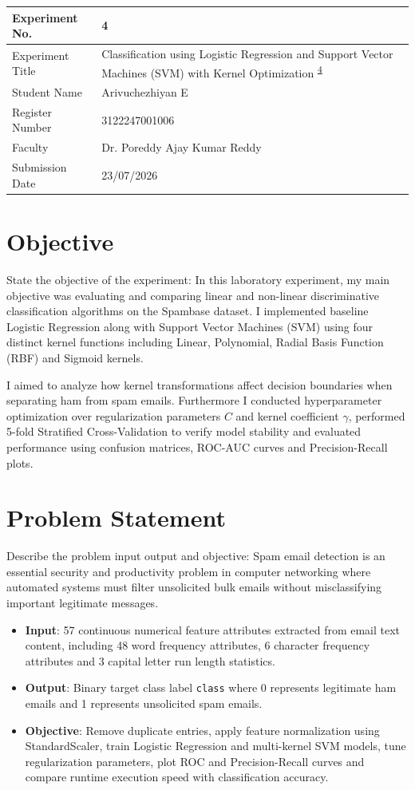 \documentclass[12pt,a4paper]{article}
\begin{document}
\begin{tabular}{|p{4cm}|p{11cm}|}
\hline
Experiment No. & 4 \\ \hline
Experiment Title & Classification using Logistic Regression and Support Vector Machines (SVM) with Kernel Optimization \textsuperscript{\href{https://github.com/arivuchezhiyan/Machine_Learning/tree/main/experiment_4}{4}} \\ \hline
Student Name & Arivuchezhiyan E \\ \hline
Register Number & 3122247001006 \\ \hline
Faculty & Dr. Poreddy Ajay Kumar Reddy \\ \hline
Submission Date & 23/07/2026 \\ \hline
\end{tabular}

\section{Objective}
State the objective of the experiment:
In this laboratory experiment, my main objective was evaluating and comparing linear and non-linear discriminative classification algorithms on the Spambase dataset. I implemented baseline Logistic Regression along with Support Vector Machines (SVM) using four distinct kernel functions including Linear, Polynomial, Radial Basis Function (RBF) and Sigmoid kernels. 

I aimed to analyze how kernel transformations affect decision boundaries when separating ham from spam emails. Furthermore I conducted hyperparameter optimization over regularization parameters $C$ and kernel coefficient $\gamma$, performed 5-fold Stratified Cross-Validation to verify model stability and evaluated performance using confusion matrices, ROC-AUC curves and Precision-Recall plots.

\section{Problem Statement}
Describe the problem input output and objective:
Spam email detection is an essential security and productivity problem in computer networking where automated systems must filter unsolicited bulk emails without misclassifying important legitimate messages.
\begin{itemize}
\item \textbf{Input}: 57 continuous numerical feature attributes extracted from email text content, including 48 word frequency attributes, 6 character frequency attributes and 3 capital letter run length statistics.
\item \textbf{Output}: Binary target class label \texttt{class} where 0 represents legitimate ham emails and 1 represents unsolicited spam emails.
\item \textbf{Objective}: Remove duplicate entries, apply feature normalization using StandardScaler, train Logistic Regression and multi-kernel SVM models, tune regularization parameters, plot ROC and Precision-Recall curves and compare runtime execution speed with classification accuracy.
\end{itemize}
\end{document}
